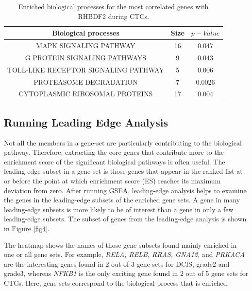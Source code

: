 \documentclass[fleqn,10pt,lineno]{wlpeerj}
\begin{document}
\begin{table}[ht]
\begin{center}
\begin{tabular}{ |c|c|c| } 
\hline
Biological processes & Size & $p-Value$ \\
\hline
MAPK SIGNALING PATHWAY & 16 & 0.047\\
\hline
G PROTEIN SIGNALING PATHWAYS & 9 & 0.043\\
\hline
TOLL-LIKE RECEPTOR SIGNALING PATHWAY & 5 & 0.006\\
\hline
PROTEASOME DEGRADATION & 7 & 0.0026\\
\hline
CYTOPLASMIC RIBOSOMAL PROTEINS & 17 & 0.004\\
\hline
\end{tabular}
\caption{\label{table4} Enriched biological processes for the most correlated genes with RHBDF2 during CTCs.}
\end{center}
\end{table} 
\newpage
\subsection*{Running Leading Edge Analysis}
Not all the members in a gene-set are particularly contributing to the biological pathway. Therefore, extracting the core genes that contribute more to the enrichment score of the significant biological pathways is often useful. The leading-edge subset in a gene set is those genes that appear in the ranked list at or before the point at which enrichment score (ES) reaches its maximum deviation from zero. After running GSEA, leading-edge analysis helps to examine the genes in the leading-edge subsets of the enriched gene sets. A gene in many leading-edge subsets is more likely to be of interest than a gene in only a few leading-edge subsets. The subset of genes from the leading-edge analysis is shown in Figure \ref{fig4}. 

The heatmap shows the names of those gene subsets found mainly enriched in one or all gene sets. For example, \textit{RELA, RELB, RRAS, GNA12,} and \textit{PRKACA} are the interesting genes found in 2 out of 3 gene sets for DCIS, grade2 and grade3, whereas \textit{NFKB1} is the only exciting gene found in 2 out of 5 gene sets for CTCs. Here, gene sets correspond to the biological process that is enriched.
\end{document}
